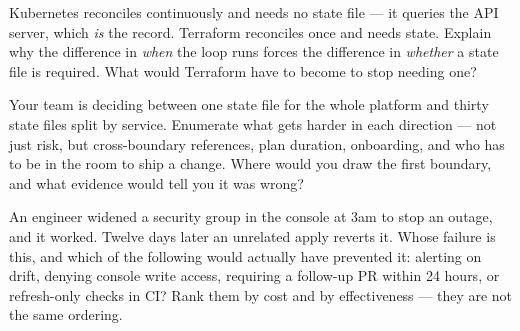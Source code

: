 
\begin{thinkbox}
Kubernetes reconciles continuously and needs no state file --- it queries the API server, which \emph{is} the record. Terraform reconciles once and needs state. Explain why the difference in \emph{when} the loop runs forces the difference in \emph{whether} a state file is required. What would Terraform have to become to stop needing one?
\end{thinkbox}

\begin{thinkbox}
Your team is deciding between one state file for the whole platform and thirty state files split by service. Enumerate what gets harder in each direction --- not just risk, but cross-boundary references, plan duration, onboarding, and who has to be in the room to ship a change. Where would you draw the first boundary, and what evidence would tell you it was wrong?
\end{thinkbox}

\begin{thinkbox}
An engineer widened a security group in the console at 3am to stop an outage, and it worked. Twelve days later an unrelated apply reverts it. Whose failure is this, and which of the following would actually have prevented it: alerting on drift, denying console write access, requiring a follow-up PR within 24 hours, or refresh-only checks in CI? Rank them by cost and by effectiveness --- they are not the same ordering.
\end{thinkbox}


